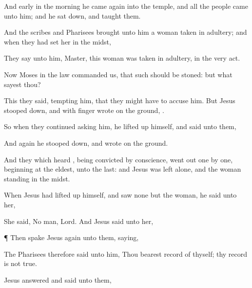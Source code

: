 {And early in the
morning he
came
again
into the
temple,
and
all the
people
came
unto
him;
and he sat
down, and
taught
them.

And the
scribes
and
Pharisees
brought
unto
him a
woman
taken
in
adultery;
and when they had
set
her
in the
midst,

They
say unto
him,
Master,
this
woman was
taken in
adultery, in the very
act.

Now
Moses
in the
law
commanded
us,
that
such should be
stoned:
but
what
sayest
thou?

This they
said,
tempting
him,
that they might
have to
accuse
him.
But
Jesus
stooped
down, and
with
{}
finger
wrote
on the
ground,
{}.

So
when they
continued
asking
him, he lifted up
himself, and
said
unto
them,
{}

And
again he
stooped
down, and
wrote
on the
ground.

And they which
heard
{}, being
convicted
by
{}
conscience, went
out
one
by
one,
beginning
at the
eldest,
{}
unto the
last:
and
Jesus was
left
alone,
and the
woman
standing
in the
midst.

When
Jesus had lifted up
himself,
and
saw
none
but the
woman, he
said unto
her,
{}

She
said, No
man,
Lord.
And
Jesus
said unto
her,
{}


\par }{\PP {}¶
Then
spake
Jesus
again unto
them,
saying,
{}

The
Pharisees
therefore
said unto
him,
Thou bearest
record
of
thyself;
thy
record
is
not
true.

Jesus
answered
and
said unto
them,
{}



}
